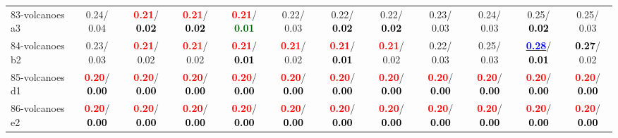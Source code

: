 \begin{table}[h]
\begin{center}
{\begin{tabular}{lc|c|c|c|c|c|c|c|c|c|c}
83-volcanoes a3 &   0.24/  0.04 & \textcolor{red}{\textbf{  0.21}}/\textcolor{black}{\textbf{  0.02}} & \textcolor{red}{\textbf{  0.21}}/\textcolor{black}{\textbf{  0.02}} & \textcolor{red}{\textbf{  0.21}}/\textcolor{darkgreen}{\textbf{  0.01}} &   0.22/  0.03 &   0.22/\textcolor{black}{\textbf{  0.02}} &   0.22/\textcolor{black}{\textbf{  0.02}} &   0.23/  0.03 &   0.24/  0.03 &   0.25/\textcolor{black}{\textbf{  0.02}} &   0.25/  0.03 \\
84-volcanoes b2 &   0.23/  0.03 & \textcolor{red}{\textbf{  0.21}}/  0.02 & \textcolor{red}{\textbf{  0.21}}/  0.02 & \textcolor{red}{\textbf{  0.21}}/\textcolor{black}{\textbf{  0.01}} & \textcolor{red}{\textbf{  0.21}}/  0.02 & \textcolor{red}{\textbf{  0.21}}/\textcolor{black}{\textbf{  0.01}} & \textcolor{red}{\textbf{  0.21}}/  0.02 &   0.22/  0.03 &   0.25/  0.03 & \underline{\textcolor{blue}{\textbf{  0.28}}}/\textcolor{black}{\textbf{  0.01}} & \textcolor{black}{\textbf{  0.27}}/  0.02 \\
85-volcanoes d1 & \textcolor{red}{\textbf{  0.20}}/\textcolor{black}{\textbf{  0.00}} & \textcolor{red}{\textbf{  0.20}}/\textcolor{black}{\textbf{  0.00}} & \textcolor{red}{\textbf{  0.20}}/\textcolor{black}{\textbf{  0.00}} & \textcolor{red}{\textbf{  0.20}}/\textcolor{black}{\textbf{  0.00}} & \textcolor{red}{\textbf{  0.20}}/\textcolor{black}{\textbf{  0.00}} & \textcolor{red}{\textbf{  0.20}}/\textcolor{black}{\textbf{  0.00}} & \textcolor{red}{\textbf{  0.20}}/\textcolor{black}{\textbf{  0.00}} & \textcolor{red}{\textbf{  0.20}}/\textcolor{black}{\textbf{  0.00}} & \textcolor{red}{\textbf{  0.20}}/\textcolor{black}{\textbf{  0.00}} & \textcolor{red}{\textbf{  0.20}}/\textcolor{black}{\textbf{  0.00}} & \textcolor{red}{\textbf{  0.20}}/\textcolor{black}{\textbf{  0.00}} \\ \hline
86-volcanoes e2 & \textcolor{red}{\textbf{  0.20}}/\textcolor{black}{\textbf{  0.00}} & \textcolor{red}{\textbf{  0.20}}/\textcolor{black}{\textbf{  0.00}} & \textcolor{red}{\textbf{  0.20}}/\textcolor{black}{\textbf{  0.00}} & \textcolor{red}{\textbf{  0.20}}/\textcolor{black}{\textbf{  0.00}} & \textcolor{red}{\textbf{  0.20}}/\textcolor{black}{\textbf{  0.00}} & \textcolor{red}{\textbf{  0.20}}/\textcolor{black}{\textbf{  0.00}} & \textcolor{red}{\textbf{  0.20}}/\textcolor{black}{\textbf{  0.00}} & \textcolor{red}{\textbf{  0.20}}/\textcolor{black}{\textbf{  0.00}} & \textcolor{red}{\textbf{  0.20}}/\textcolor{black}{\textbf{  0.00}} & \textcolor{red}{\textbf{  0.20}}/\textcolor{black}{\textbf{  0.00}} & \textcolor{red}{\textbf{  0.20}}/\textcolor{black}{\textbf{  0.00}} \\

\end{tabular}}
\end{center}
\end{table}
